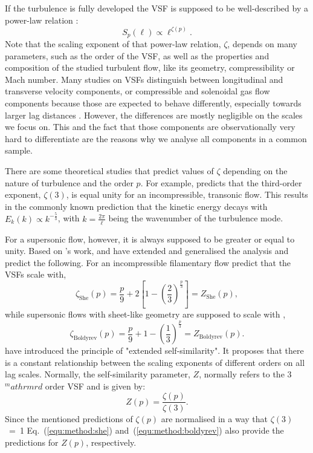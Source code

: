 If the turbulence is fully developed the VSF is supposed to be well-described by a power-law relation \citep{Kolmogorov1941,She1994,Boldyrev2002}:
\begin{equation}
	\mathit{S}_p (\ell) \propto \ell^{\zeta(p)} .
    \label{equ:method:propto_zeta}
\end{equation}
Note that the scaling exponent of that power-law relation, $\zeta$, depends on many parameters, such as the order of the VSF, as well as the properties and composition of the studied turbulent flow, like its geometry, compressibility or Mach number.
Many studies on VSFs distinguish between longitudinal and transverse velocity components, or compressible and solenoidal gas flow components because those are expected to behave differently, especially towards larger lag distances \citep{Gotoh2002,Schmidt2008,Benzi2010}.
However, the differences are mostly negligible on the scales we focus on. 
This and the fact that those components are observationally very hard to differentiate are the reasons why we analyse all components in a common sample.

There are some theoretical studies that predict values of $\zeta$ depending on the nature of turbulence and the order $p$.
For example, \citet{Kolmogorov1941} predicts that the third-order exponent, $\zeta(3)$, is equal unity for an incompressible, transonic flow.
This results in the commonly known prediction that the kinetic energy decays with $E_k(k) \propto k^{-\frac{5}{3}}$, with $k = \frac{2 \pi}{\ell}$ being the wavenumber of the turbulence mode.

For a supersonic flow, however, it is always supposed to be greater or equal to unity.
Based on \citeauthor{Kolmogorov1941}'s work, \citet{She1994} and \citet{Boldyrev2002} have extended and generalised the analysis and predict the following.
For an incompressible filamentary flow \citet{She1994} predict that the VSFs scale with,
\begin{equation}
	\zeta_\mathrm{She}(p) = \frac{p}{9} + 2 \left[ 1 - \left( \frac{2}{3} \right)^{\frac{p}{3}} \right] = Z_\mathrm{She}(p) ,
    \label{equ:method:she}
\end{equation}
while supersonic flows with sheet-like geometry are supposed to scale with \citep{Boldyrev2002},
\begin{equation}
	 \zeta_\mathrm{Boldyrev}(p) = \frac{p}{9} + 1 - \left( \frac{1}{3} \right)^{\frac{p}{3}} = Z_\mathrm{Boldyrev}(p) .
    \label{equ:method:boldyrev}
\end{equation}
\citet{Benzi1993} have introduced the principle of "extended self-similarity".
It proposes that there is a constant relationship between the scaling exponents of different orders on all lag scales. Normally, the self-similarity parameter, $Z$, normally refers to the 3$^mathrm{rd}$ order VSF and is given by:
\begin{equation}
	Z(p) = \frac{\zeta(p)}{\zeta(3)} .
	\label{equ:method:z_def}
\end{equation} 
Since the mentioned predictions of $\zeta(p)$ are normalised in a way that $\zeta(3)$~=~1 Eq.~(\ref{equ:method:she}) and~(\ref{equ:method:boldyrev}) also provide the predictions for $Z(p)$, respectively.


